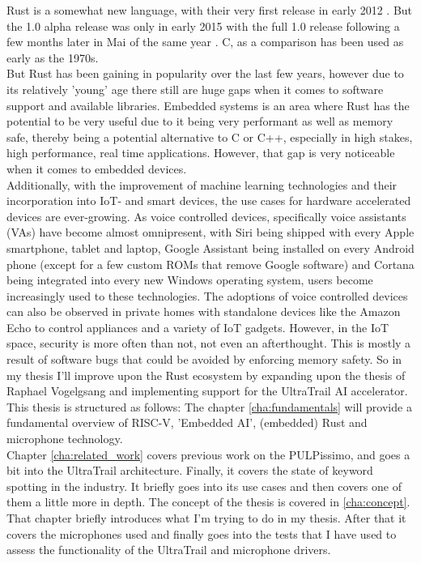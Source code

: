 

Rust \cite{rustlang} is a somewhat new language,
with their very first release in early 2012 \cite{rust_releases}.
But the 1.0 alpha release was only in early 2015 \cite{rust_releases}
with the full 1.0 release following a few months later in Mai of the same year \cite{rust_releases}.
C, as a comparison has been used as early as the 1970s.\\
But Rust has been gaining in popularity \cite{rust_popularity} over the last few years, however
due to its relatively 'young' age there still are huge gaps when it comes to software support and available libraries.
Embedded systems is an area where Rust has the potential to be very useful due to it being very performant as well as memory safe,
thereby being a potential alternative to C or C++, especially in high stakes, high performance, real time applications.
However, that gap is very noticeable when it comes to embedded devices.\\
Additionally, with the improvement of machine learning technologies and their incorporation into IoT- and smart devices,
the use cases for hardware accelerated devices are ever-growing.
As voice controlled devices, specifically voice assistants (VAs) have become almost omnipresent,
with Siri being shipped with every Apple smartphone, tablet and laptop, Google Assistant being installed
on every Android phone (except for a few custom ROMs that remove Google software) and Cortana being integrated
into every new Windows operating system, users become increasingly used to these technologies.
The adoptions of voice controlled devices can also be observed in private homes with standalone
devices like the Amazon Echo to control appliances and a variety of IoT gadgets.
However, in the IoT space, security is more often than not, not even an afterthought.
This is mostly a result of software bugs that could be avoided by enforcing memory safety.
So in my thesis I'll improve upon the Rust ecosystem by expanding upon the thesis of Raphael Vogelgsang \cite{rust_pulp}
and implementing support for the UltraTrail \cite{ultratrail} AI accelerator.
\newpage
This thesis is structured as follows:
The chapter \ref{cha:fundamentals} will provide a fundamental overview of RISC-V, 'Embedded AI', (embedded) Rust and microphone technology.\\
Chapter \ref{cha:related_work} covers previous work on the PULPissimo, and goes a bit into the UltraTrail architecture.
Finally, it covers the state of keyword spotting in the industry.
It briefly goes into its use cases and then covers one of them a little more in depth.
The concept of the thesis is covered in \ref{cha:concept}.
That chapter briefly introduces what I'm trying to do in my thesis.
After that it covers the microphones used and finally goes into the tests that I have used
to assess the functionality of the UltraTrail and microphone drivers.


